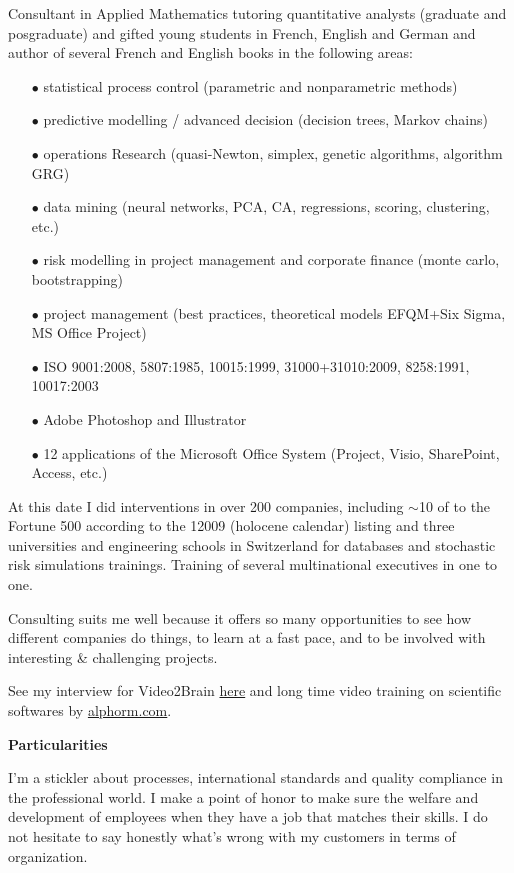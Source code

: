 	Consultant in Applied Mathematics tutoring quantitative analysts (graduate and posgraduate) and gifted young students in French, English and German and author of several French and English books in the following areas:
	\pagebreak
	\begin{itemize}	 
		\item[$\bullet$] statistical process control (parametric and nonparametric methods)
		\item[$\bullet$] predictive modelling / advanced decision (decision trees, Markov chains)
		\item[$\bullet$] operations Research (quasi-Newton, simplex, genetic algorithms, algorithm GRG)
		\item[$\bullet$] data mining (neural networks, PCA, CA, regressions, scoring, clustering, etc.)
		\item[$\bullet$] risk modelling in project management and corporate finance (monte carlo, bootstrapping)
		\item[$\bullet$] project management (best practices, theoretical models EFQM+Six Sigma, MS Office Project)
		\item[$\bullet$] ISO 9001:2008, 5807:1985, 10015:1999, 31000+31010:2009, 8258:1991, 10017:2003
		\item[$\bullet$] Adobe Photoshop and Illustrator
		\item[$\bullet$] 12 applications of the Microsoft Office System (Project, Visio, SharePoint, Access, etc.)
	\end{itemize}
	At this date I did interventions in over 200 companies, including $\sim$10 of to the Fortune 500 according to the 12009 (holocene calendar) listing and three universities and engineering schools in Switzerland for databases and stochastic risk simulations trainings. Training of several multinational executives in one to one.

	Consulting suits me well because it offers so many opportunities to see how different companies do things, to learn at a fast pace, and to be involved with interesting \& challenging projects.

	See my interview for Video2Brain \href{http://www.youtube.com/watch?v=nOYwENyVPJQ}{{\color{blue}here}} and long time video training on scientific softwares by \href{http://www.alphorm.com}{{\color{blue}alphorm.com}}.

\textbf{Particularities}	

	I'm a stickler about processes, international standards and quality compliance in the professional world. I make a point of honor to make sure the welfare and development of employees when they have a job that matches their skills. I do not hesitate to say honestly what's wrong with my customers in terms of organization.
	
